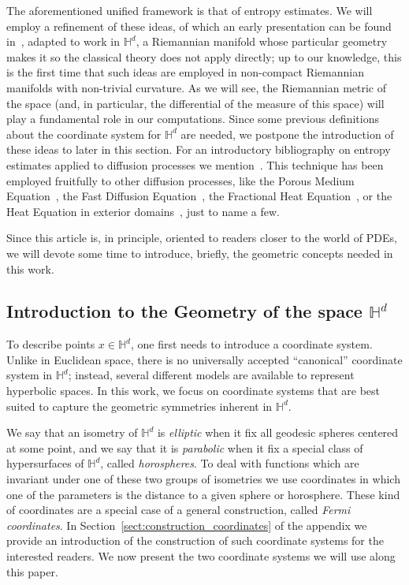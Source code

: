 \documentclass[12pt,longbibliography]{article}
\def\H{\mathbb{H}}
\theoremstyle{definition}
\theoremstyle{remark}
\theoremstyle{example}
\begin{document}
The aforementioned unified framework is that of entropy estimates. We will employ a refinement of these ideas, of which an early presentation can be found in~\cite{Arnold-Markovich-Toscani-Uterretiter-2001,toscani,Toscani99}, adapted to work in $\H^d$, a Riemannian manifold whose particular geometry makes it so the classical theory does not apply directly; up to our knowledge, this is the first time that such ideas are employed in non-compact Riemannian manifolds with non-trivial curvature. As we will see, the Riemannian metric of the space (and, in particular, the differential of the measure of this space) will play a fundamental role in our computations. Since some previous definitions about the coordinate system for $\H^d$ are needed, we postpone the introduction of these ideas to later in this section. For an introductory bibliography on entropy estimates applied to diffusion processes we mention~\cite{Arnold-Carrillo-Desvillettes-et-al-2004,Vazquez-Arxiv-2018}. This technique has been employed fruitfully to other diffusion processes, like the Porous Medium Equation~\cite{Carrillo-Toscani-2000}, the Fast Diffusion Equation~\cite{Bonforte-Dolbeault-Grillo-Vazquez-2010}, the Fractional Heat Equation~\cite{Gentil-Imbert-2008}, or the Heat Equation in exterior domains~\cite{CGQ}, just to name a few.

Since this article is, in principle, oriented to readers closer to the world of PDEs, we will devote some time to introduce, briefly, the geometric concepts needed in this work.

\subsection{Introduction to the Geometry of the space $\H^d$}

To describe points \(x \in \mathbb{H}^d\), one first needs to introduce a coordinate system. Unlike in Euclidean space, there is no universally accepted “canonical” coordinate system in \(\mathbb{H}^d\); instead, several different models are available to represent hyperbolic spaces. In this work, we focus on coordinate systems that are best suited to capture the geometric symmetries inherent in \(\mathbb{H}^d\). 

We say that an isometry of $\mathbb{H}^d$ is \textit{elliptic} when it fix all geodesic spheres centered at some point, and we say that it is \textit{parabolic} when it fix a special class of hypersurfaces of $\mathbb{H}^d$, called \textit{horospheres}. To deal with functions which are invariant under one of these two groups of isometries we use coordinates in which one of the parameters is the distance to a given sphere or horosphere. These kind of coordinates are a special case of a general construction, called \textit{Fermi coordinates}. In Section~\ref{sect:construction_coordinates} of the appendix we provide an introduction of the construction of such coordinate systems for the interested readers. We now present the two coordinate systems we will use along this paper. 
\end{document}
